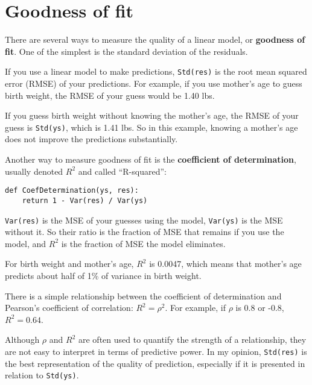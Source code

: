 \section{Goodness of fit}
\label{goodness}

There are several ways to measure the quality of a linear model, or
{\bf goodness of fit}.  One of the simplest is the standard deviation
of the residuals.

If you use a linear model to make predictions, {\tt Std(res)}
is the root mean squared error (RMSE) of your predictions.  For
example, if you use mother's age to guess birth weight, the RMSE of
your guess would be 1.40 lbs.

If you guess birth weight without knowing the mother's age, the RMSE
of your guess is {\tt Std(ys)}, which is 1.41 lbs.  So in this
example, knowing a mother's age does not improve the predictions
substantially.

Another way to measure goodness of fit is  the {\bf
  coefficient of determination}, usually denoted $R^2$ and 
called ``R-squared'':

\begin{verbatim}
def CoefDetermination(ys, res):
    return 1 - Var(res) / Var(ys)
\end{verbatim}

{\tt Var(res)} is the MSE of your guesses using the model,
{\tt Var(ys)} is the MSE without it.   So their ratio is the fraction
of MSE that remains if you use the model, and $R^2$ is the fraction
of MSE the model eliminates.

For birth weight and mother's age, $R^2$ is 0.0047, which means
that mother's age predicts about half of 1\% of variance in
birth weight.

There is a simple relationship between the coefficient of
determination and Pearson's coefficient of correlation: $R^2 = \rho^2$.
For example, if $\rho$ is 0.8 or -0.8, $R^2 = 0.64$.

Although $\rho$ and $R^2$ are often used to quantify the strength of a
relationship, they are not easy to interpret in terms of predictive
power.  In my opinion, {\tt Std(res)} is the best representation
of the quality of prediction, especially if it is presented
in relation to {\tt Std(ys)}.

